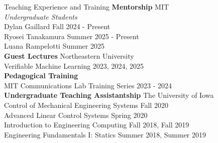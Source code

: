 \begin{rSection}{Teaching Experience and Training}
    {\bf Mentorship} \hfill MIT\\
    \textit{Undergraduate Students}\\
    Dylan Gaillard \hfill Fall 2024 - Present\\
    Ryosei Tanakamura \hfill Summer 2025 - Present\\
    Luana Rampelotti \hfill Summer 2025\\

    {\bf Guest Lectures} \hfill Northeastern University\\
    Verifiable Machine Learning \hfill 2023, 2024, 2025\\

    {\bf Pedagogical Training}\\
    MIT Communications Lab Training Series \hfill 2023 - 2024\\

    {\bf Undergraduate Teaching Assistantship} \hfill The University of Iowa\\
    Control of Mechanical Engineering Systems \hfill Fall 2020\\
    Advanced Linear Control Systems \hfill Spring 2020\\
    Introduction to Engineering Computing \hfill Fall 2018, Fall 2019\\
    Engineering Fundamentals I: Statics \hfill Summer 2018, Summer 2019\\

\end{rSection}